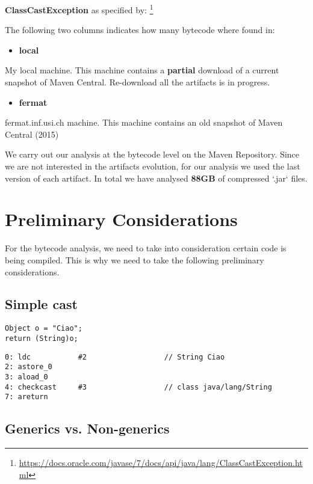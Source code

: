 \documentclass{usiinfdocprop}
\begin{document}
\textbf{ClassCastException} as specified by: 
\footnote{\url{https://docs.oracle.com/javase/7/docs/api/java/lang/ClassCastException.html}} 

The following two columns indicates how many bytecode where found in: 
\begin{itemize}
\item \textbf{local}
\end{itemize}
My local machine. 
This machine contains a \textbf{partial} download of a current snapshot of Maven Central. 
Re-download all the artifacts is in progress. 
\begin{itemize}
\item \textbf{fermat}
\end{itemize}
fermat.inf.usi.ch machine. 
This machine contains an old snapshot of Maven Central (2015)  

We carry out our analysis at the bytecode level on the Maven Repository. 
Since we are not interested in the artifacts evolution, 
for our analysis we used the last version of each artifact. 
In total we have analysed \textbf{88GB} of compressed `.jar` files. 

\section{Preliminary Considerations}
\label{sec:org1870116}

For the bytecode analysis, we need to take into consideration certain code is being compiled. 
This is why we need to take the following preliminary considerations. 

\subsection{Simple cast}
\label{sec:org144c36d}

\lstset{language=java,label= ,caption= ,captionpos=b,numbers=none}
\begin{lstlisting}
Object o = "Ciao"; 
return (String)o; 
\end{lstlisting}

\begin{verbatim}
0: ldc           #2                  // String Ciao 
2: astore_0 
3: aload_0 
4: checkcast     #3                  // class java/lang/String 
7: areturn 
\end{verbatim}

\subsection{Generics vs. Non-generics}
\label{sec:org2757057}
\end{document}
